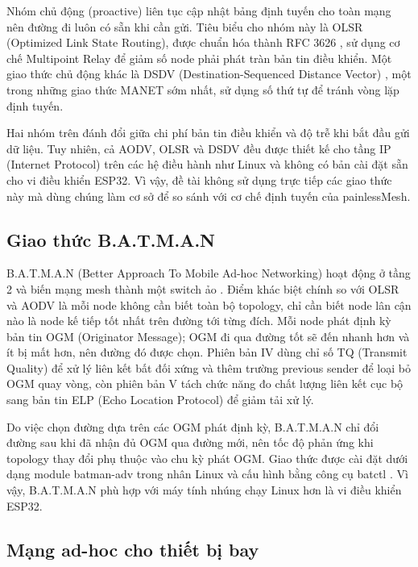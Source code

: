 Nhóm chủ động (proactive) liên tục cập nhật bảng định tuyến cho toàn mạng nên đường đi luôn có sẵn khi cần gửi. Tiêu biểu cho nhóm này là OLSR (Optimized Link State Routing), được chuẩn hóa thành RFC 3626 \citep{clausen2003olsr}, sử dụng cơ chế Multipoint Relay để giảm số node phải phát tràn bản tin điều khiển. Một giao thức chủ động khác là DSDV (Destination-Sequenced Distance Vector) \citep{perkins1994dsdv}, một trong những giao thức MANET sớm nhất, sử dụng số thứ tự để tránh vòng lặp định tuyến.

Hai nhóm trên đánh đổi giữa chi phí bản tin điều khiển và độ trễ khi bắt đầu gửi dữ liệu. Tuy nhiên, cả AODV, OLSR và DSDV đều được thiết kế cho tầng IP (Internet Protocol) trên các hệ điều hành như Linux và không có bản cài đặt sẵn cho vi điều khiển ESP32. Vì vậy, đề tài không sử dụng trực tiếp các giao thức này mà dùng chúng làm cơ sở để so sánh với cơ chế định tuyến của painlessMesh.


\subsection{Giao thức B.A.T.M.A.N}

B.A.T.M.A.N (Better Approach To Mobile Ad-hoc Networking) hoạt động ở tầng 2 và biến mạng mesh thành một switch ảo \citep{openmesh}. Điểm khác biệt chính so với OLSR và AODV là mỗi node không cần biết toàn bộ topology, chỉ cần biết node lân cận nào là node kế tiếp tốt nhất trên đường tới từng đích. Mỗi node phát định kỳ bản tin OGM (Originator Message); OGM đi qua đường tốt sẽ đến nhanh hơn và ít bị mất hơn, nên đường đó được chọn. Phiên bản IV dùng chỉ số TQ (Transmit Quality) để xử lý liên kết bất đối xứng và thêm trường previous sender để loại bỏ OGM quay vòng, còn phiên bản V tách chức năng đo chất lượng liên kết cục bộ sang bản tin ELP (Echo Location Protocol) để giảm tải xử lý.

Do việc chọn đường dựa trên các OGM phát định kỳ, B.A.T.M.A.N chỉ đổi đường sau khi đã nhận đủ OGM qua đường mới, nên tốc độ phản ứng khi topology thay đổi phụ thuộc vào chu kỳ phát OGM. Giao thức được cài đặt dưới dạng module batman-adv trong nhân Linux và cấu hình bằng công cụ batctl \citep{openmesh}. Vì vậy, B.A.T.M.A.N phù hợp với máy tính nhúng chạy Linux hơn là vi điều khiển ESP32.


\subsection{Mạng ad-hoc cho thiết bị bay}

